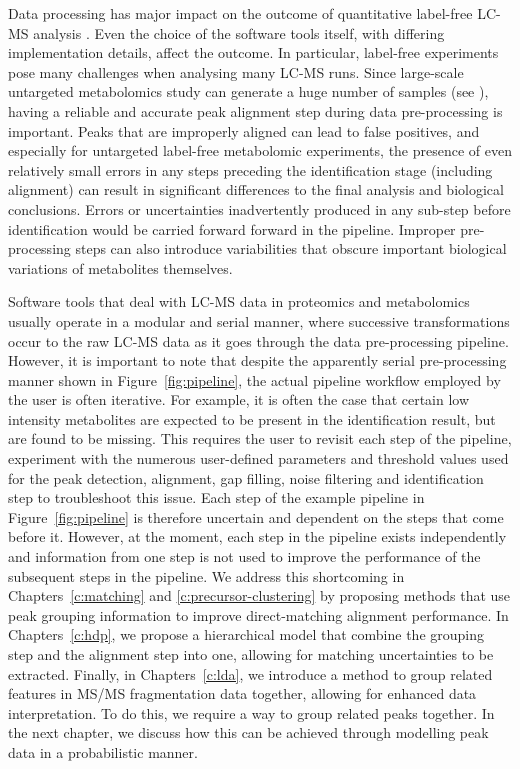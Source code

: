 Data processing has major impact on the outcome of quantitative label-free LC-MS analysis \cite{Chawade2015}. Even the choice of the software tools itself, with differing implementation details, affect the outcome. In particular, label-free experiments pose many challenges when analysing many LC-MS runs. Since large-scale untargeted metabolomics study can generate a huge number of samples (see \cite{DeVos2007a,Creek2011}), having a reliable and accurate peak alignment step during data pre-processing is important. Peaks that are improperly aligned can lead to false positives, and especially for untargeted label-free metabolomic experiments, the presence of even relatively small errors in any steps preceding the identification stage (including alignment) can result in significant differences to the final analysis and biological conclusions. Errors or uncertainties inadvertently produced in any sub-step before identification would be carried forward forward in the pipeline. Improper pre-processing steps can also introduce variabilities that obscure important biological variations of metabolites themselves. 

Software tools that deal with LC-MS data in proteomics and metabolomics usually operate in a modular and serial manner, where successive transformations occur to the raw LC-MS data as it goes through the data pre-processing pipeline. However, it is important to note that despite the apparently serial pre-processing manner shown in Figure~\ref{fig:pipeline}, the actual pipeline workflow employed by the user is often iterative. For example, it is often the case that certain low intensity metabolites are expected to be present in the identification result, but are found to be missing. This requires the user to revisit each step of the pipeline, experiment with the numerous user-defined parameters and threshold values used for the peak detection, alignment, gap filling, noise filtering and identification step to troubleshoot this issue. Each step of the example pipeline in Figure~\ref{fig:pipeline} is therefore uncertain and dependent on the steps that come before it. However, at the moment, each step in the pipeline exists independently and information from one step is not used to improve the performance of the subsequent steps in the pipeline. We address this shortcoming in Chapters~\ref{c:matching} and \ref{c:precursor-clustering} by proposing methods that use peak grouping information to improve direct-matching alignment performance. In Chapters~\ref{c:hdp}, we propose a hierarchical model that combine the grouping step and the alignment step into one, allowing for matching uncertainties to be extracted. Finally, in Chapters~\ref{c:lda}, we introduce a method to group related features in MS/MS fragmentation data together, allowing for enhanced data interpretation. To do this, we require a way to group related peaks together. In the next chapter, we discuss how this can be achieved through modelling peak data in a probabilistic manner.